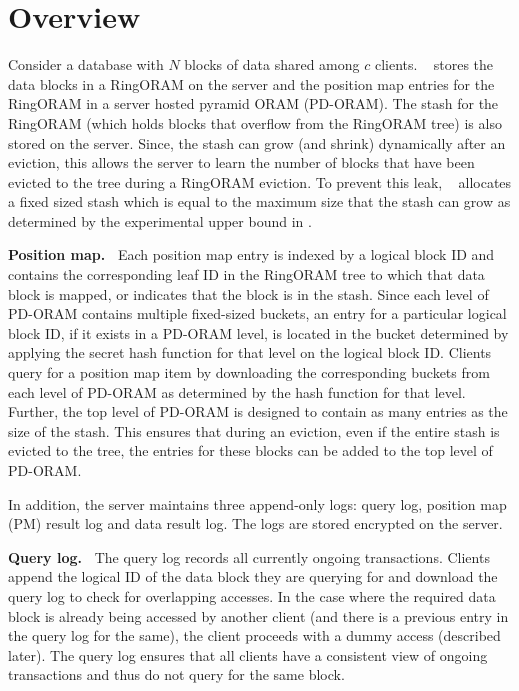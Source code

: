 \section{Overview}
\label{oram:overview}
Consider a database with $N$ blocks of data shared among $c$ clients.
\sysname~ stores the data blocks in a RingORAM on the server and the position map entries for the RingORAM in a server hosted 
pyramid ORAM (PD-ORAM). 
The stash for the RingORAM (which 
holds blocks that overflow from the RingORAM tree) is also stored on the server. 
Since, the stash can grow (and shrink) dynamically after an eviction, this allows the server to learn 
the number of blocks that have been evicted to the tree during a RingORAM eviction. To prevent this leak, \sysname~ 
allocates a fixed sized stash which is equal to the maximum size that the stash can grow as determined by the experimental 
upper bound in \cite{ringoram}.

{\bf Position map.~}
%
Each position map entry is indexed by a logical block ID and contains 
the corresponding leaf ID in the RingORAM tree to which that data block is mapped, or 
indicates that the block is in the stash. Since each level of PD-ORAM contains multiple fixed-sized buckets, 
an entry for a particular logical block ID, if it exists in a PD-ORAM level, is located 
in the bucket determined by applying the secret hash function for that level on the 
logical block ID. Clients query for a position map item by downloading the corresponding buckets
from each level of PD-ORAM as determined by the hash function for that level. 
Further, the top level of PD-ORAM is designed to contain as many entries as the size of the stash. 
This ensures that during an eviction, even if the entire stash is evicted to the tree, the entries for these 
blocks can be added to the top level of PD-ORAM.

In addition, the server maintains 
three append-only logs: query log, position map (PM) result log 
and data result log. The logs are stored encrypted on the server.


{\bf Query log.~}
%
The query log records all currently ongoing transactions. Clients 
append the logical ID of the data block they are querying for and download
the query log to check for overlapping accesses. 
In the case where the required data block is already being accessed by another client (and there 
is a previous entry in the query log for the same), the client 
proceeds with a dummy access (described later). The query log ensures that all 
clients have a consistent view of ongoing transactions and thus do not query for the 
same block.

